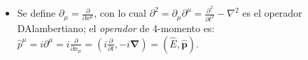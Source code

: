 {\begin{itemize}
	\item Se define $\partial_\mu=\frac{\partial}{\partial x^{\mu}}$, con lo cual $\partial^2=\partial_\mu \partial^{\mu}= \frac{\partial^2}{\partial t^2}-\nabla^2$ es el operador D\textquotesingle Alambertiano; el \textit{operador} de 4-momento es: $\hat{p}^\mu= i\partial^\mu=i\frac{\partial}{\partial x_\mu}=(i\frac{\partial}{\partial t},-i\mathbf{\nabla})=(\hat{E},\mathbf{\hat{p}})$.
	
\end{itemize}
}
